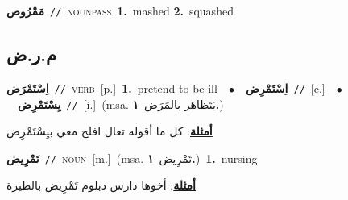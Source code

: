 \documentclass[10pt,a4paper,twoside]{article} %
\begin{document}
\begin{multicols}{2}
{\setlength\topsep{0pt}\textbf{\foreignlanguage{arabic}{مَمْرُوص}}\ {\color{gray}\texttt{//}\color{black}}\ \textsc{noun\textunderscore pass}\ \textbf{1.}~mashed  \textbf{2.}~squashed\ } \vspace{2mm}

\vspace{-3mm}
\subsection*{\color{blue}\foreignlanguage{arabic}{م.ر.ض}\color{blue}{}} 

{\setlength\topsep{0pt}\textbf{\foreignlanguage{arabic}{اِسْتَمْرَض}}\ {\color{gray}\texttt{//}\color{black}}\ \textsc{verb}\ [p.]\ \textbf{1.}~pretend to be ill\ \ $\bullet$\ \ \setlength\topsep{0pt}\textbf{\foreignlanguage{arabic}{اِسْتَمْرِض}}\ {\color{gray}\texttt{//}\color{black}}\ [c.]\ \ $\bullet$\ \ \setlength\topsep{0pt}\textbf{\foreignlanguage{arabic}{يِسْتَمْرِض}}\ {\color{gray}\texttt{//}\color{black}}\ [i.]\ \color{gray}(msa. \foreignlanguage{arabic}{يَتَظاهَر بالمَرَض}~\foreignlanguage{arabic}{\textbf{١.}})\color{black}\  \begin{flushright}\color{gray}\foreignlanguage{arabic}{\textbf{\underline{\foreignlanguage{arabic}{أمثلة}}}: كل ما أقوله تعال افلح معي بيِسْتَمْرِض}\end{flushright}\color{black}} \vspace{2mm}

{\setlength\topsep{0pt}\textbf{\foreignlanguage{arabic}{تَمْرِيض}}\ {\color{gray}\texttt{//}\color{black}}\ \textsc{noun}\ [m.]\ \color{gray}(msa. \foreignlanguage{arabic}{تَمْرِيض}~\foreignlanguage{arabic}{\textbf{١.}})\color{black}\ \textbf{1.}~nursing\  \begin{flushright}\color{gray}\foreignlanguage{arabic}{\textbf{\underline{\foreignlanguage{arabic}{أمثلة}}}: أخوها دارس دبلوم تَمْرِيض بالطيرة}\end{flushright}\color{black}} \vspace{2mm}


\end{multicols}
\end{document}
